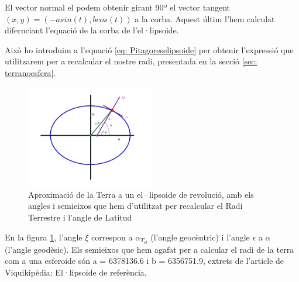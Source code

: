 \documentclass[11pt]{article}
\begin{document}
El vector normal el podem obtenir girant 90º el vector tangent $(x,y) = (-asin(t),bcos(t))$ a la corba. Aquest últim l'hem calculat difernciant l'equació de la corba de l'el·lipsoide.

Això ho introduim a l'equació \eqref{eq: Pitagoreselipsoide} per obtenir l'expressió que utilitzarem per a recalcular el nostre radi, presentada en la secció \ref{sec: terranoesfera}.

\begin{figure}[H]
    \centering
    \includegraphics[width=0.5\textwidth]{Terraelipsoide.jpg}
    \caption{Aproximació de la Terra a un el·lipsoide de revolució, amb els angles i semieixos que hem d'utilitzat per recalcular el Radi Terrestre i l'angle de Latitud}
    \label{fig:terraelipsoide}
\end{figure}

En la figura \ref{fig:terraelipsoide}, l'angle $\xi$ correspon a $\alpha_{T_{el}}$ (l'angle geocèntric) i l'angle $\epsilon$ a $\alpha$ (l'angle geodèsic). Els semieixos que hem agafat per a calcular el radi de la terra com a una esferoide són a = 6378136.6 i b = 6356751.9, extrets de l'article de Viquikipèdia: El·lipsoide de referència.

\end{document}
